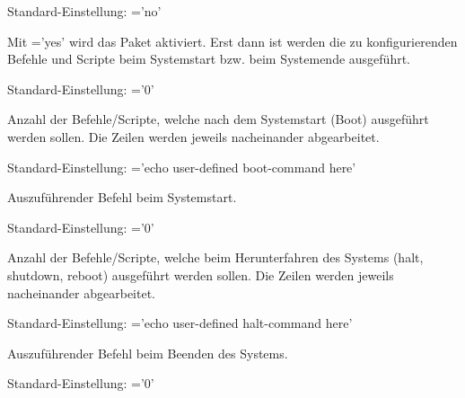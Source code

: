 \begin{description}


        Standard-Einstellung: ='no'

    Mit ='yes' wird das Paket aktiviert. Erst dann ist werden die zu
    konfigurierenden Befehle und Scripte beim Systemstart bzw. beim Systemende
    ausgeführt.



        Standard-Einstellung: ='0'

    Anzahl der Befehle/Scripte, welche nach dem Systemstart (Boot) ausgeführt werden
    sollen. Die Zeilen werden jeweils nacheinander abgearbeitet.


        Standard-Einstellung: ='echo user-defined boot-command here'

    Auszuführender Befehl beim Systemstart.




        Standard-Einstellung: ='0'

    Anzahl der Befehle/Scripte, welche beim Herunterfahren des Systems (halt, shutdown, reboot)
    ausgeführt werden sollen. Die Zeilen werden jeweils nacheinander abgearbeitet.


        Standard-Einstellung: ='echo user-defined halt-command here'

    Auszuführender Befehl beim Beenden des Systems.



        Standard-Einstellung: ='0'


\end{description}
